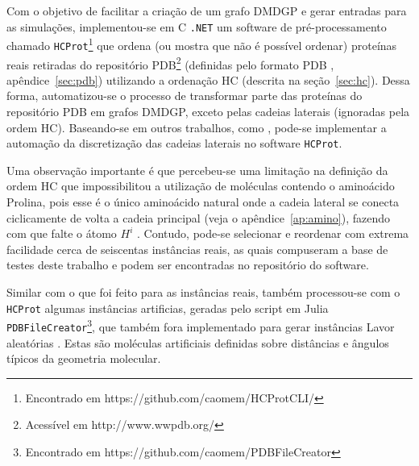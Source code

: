 \documentclass[a4paper,12pt]{report}
\theoremstyle{plain}
\theoremstyle{definition}
\begin{document}
	Com o objetivo de facilitar a criação de um grafo DMDGP e gerar entradas para as simulações, implementou-se em {C\nolinebreak[4]\hspace{-.05em}\raisebox{.4ex}{\footnotesize\bf \#}} \texttt{.NET} um software de pré-processamento chamado \texttt{HCProt}\footnote{Encontrado em https://github.com/caomem/HCProtCLI/} que ordena (ou mostra que não é possível ordenar) proteínas reais retiradas do repositório PDB\footnote{Acessível em http://www.wwpdb.org/} (definidas pelo formato PDB \cite{bernstein1977protein}, apêndice~\ref{sec:pdb}) utilizando a ordenação HC (descrita na seção~\ref{sec:hc}). Dessa forma, automatizou-se o processo de transformar parte das proteínas do repositório PDB em grafos DMDGP, exceto pelas cadeias laterais (ignoradas pela ordem HC). Baseando-se em outros trabalhos, como \cite{douglasSideChainOrder}, pode-se implementar a automação da discretização das cadeias laterais no software \texttt{HCProt}.
	
	Uma observação importante é que percebeu-se uma limitação na definição da ordem HC que impossibilitou a utilização de moléculas contendo o aminoácido Prolina, pois esse é o único aminoácido natural onde a cadeia lateral se conecta ciclicamente de volta a cadeia principal (veja o apêndice~\ref{ap:amino}), fazendo com que falte o átomo $H^i$ \cite{bioquimicaLehninger}. Contudo, pode-se selecionar e reordenar com extrema facilidade cerca de seiscentas instâncias reais, as quais compuseram a base de testes deste trabalho e podem ser encontradas no repositório do software.

	Similar com o que foi feito para as instâncias reais, também processou-se com o \texttt{HCProt} algumas instâncias artificias, geradas pelo script em Julia \texttt{PDBFileCreator}\footnote{Encontrado em https://github.com/caomem/PDBFileCreator}, que também fora implementado para gerar instâncias Lavor aleatórias \cite{carlile:instancesMDGP}. Estas são moléculas artificiais definidas sobre distâncias e ângulos típicos da geometria molecular.
	
\end{document}
